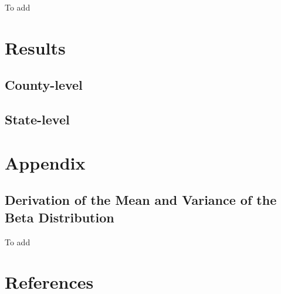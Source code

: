 \documentclass[12pt,twoside]{smiththesis}
\begin{document}
To add

\hypertarget{results}{%
\chapter{Results}\label{results}}

\hypertarget{county-level}{%
\section{County-level}\label{county-level}}

\hypertarget{state-level}{%
\section{State-level}\label{state-level}}

\appendix

\hypertarget{appendix}{%
\chapter{Appendix}\label{appendix}}

\hypertarget{derivation-of-the-mean-and-variance-of-the-beta-distribution}{%
\section{Derivation of the Mean and Variance of the Beta Distribution}\label{derivation-of-the-mean-and-variance-of-the-beta-distribution}}

To add

\backmatter

\hypertarget{references}{%
\chapter*{References}\label{references}}


\noindent

\setlength{\parindent}{-0.20in}
\setlength{\leftskip}{0.20in}
\setlength{\parskip}{8pt}
\end{document}
